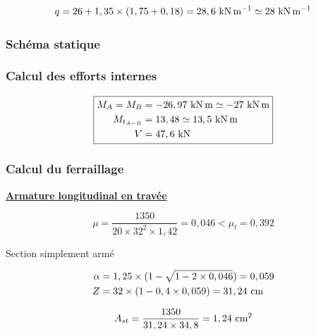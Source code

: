 \[ q = 26 + 1,35 \times (1,75 + 0,18) = 28,6\knm \simeq 28\knm \]


\subsubsection{Schéma statique}

\begin{figure}[H]
	\centering
\end{figure}


\subsubsection{Calcul des efforts internes}

\[ \fbox{$\begin{aligned}
		M_{A} = M_{B} &= -26,97\knxm \simeq -27\knxm \\
		\mmt{A-B} &= 13,48 \simeq 13,5\knxm \\
		V &= 47,6\kn
	\end{aligned}$} \]

\subsubsection{Calcul du ferraillage}

\textbf{\underline{Armature longitudinal en travée}}

\[ \mu = \dfrac{1350}{20 \times 32^{2} \times 1,42} = 0,046 < \mu_{l} = 0,392 \]
{\centering Section simplement armé\par}

\[ \begin{aligned}
	\alpha &= 1,25 \times (1 - \sqrt{1 - 2 \times 0,046}) = 0,059 \\
	Z &= 32 \times (1 - 0,4 \times 0,059) = 31,24\cml
\end{aligned} \]

\[ A_{st} = \dfrac{1350}{31,24 \times 34,8} = 1,24\cmsq \]


